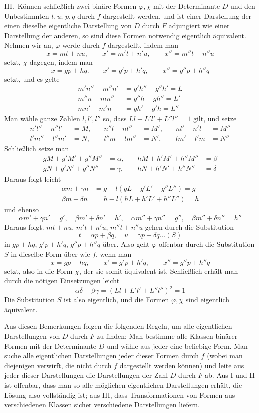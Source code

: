 III.\ Können schließlich zwei binäre Formen $\varphi,\chi$ mit der Determinante
$D$ und den Unbestimmten $t,u$; $p,q$ durch $f$ dargestellt
werden, und ist einer Darstellung der einen dieselbe eigentliche Darstellung
von $D$ durch $F$ adjungiert wie einer Darstellung der anderen,
so sind diese Formen notwendig eigentlich äquivalent. Nehmen wir an,
$\varphi$ werde durch $f$ dargestellt, indem man
\[
x=mt+nu,\qquad x'=m't+n'u,\qquad x''=m''t+n''u
\]
setzt, $\chi$ dagegen, indem man
\[
x=gp+hq.\qquad x'=g'p+h'q,\qquad x''=g''p+h''q
\]
setzt, und es gelte
\[
\begin{aligned}
m'n''-m''n'&=g'h''-g''h'=L\\
m''n-mn''&=g''h-gh''=L'\\
mn'-m'n&=gh'-g'h=L''
\end{aligned}
\]
Man wähle ganze Zahlen $l,l',l''$ so, dass $Ll+L'l'+L''l''=1$ gilt, und setze
\[
\begin{aligned}
n'l''-n''l'&=M,&\quad n''l-nl''&=M',&\quad nl'-n'l&=M''\\
l'm''-l''m'&=N,&\quad l''m-lm''&=N',&\quad lm'-l'm&=N''
\end{aligned}
\]
Schließlich setze man
\[
\begin{aligned}
gM+g'M'+g''M''&=\alpha,&\quad hM+h'M'+h''M''&=\beta\\
gN+g'N'+g''N''&=\gamma,&\quad hN+h'N'+h''N''&=\delta
\end{aligned}
\]
Daraus folgt leicht
\[
\begin{aligned}
\alpha m+\gamma n&=g-l(gL+g'L'+g''L'')=g\\
\beta m+\delta n&=h-l(hL+h'L'+h''L'')=h
\end{aligned}
\]
und ebenso
\[
\alpha m'+\gamma n'=g',\quad \beta m'+\delta n'=h',\quad
\alpha m''+\gamma n''=g'',\quad \beta m''+\delta n''=h''
\]
Daraus folgt. $mt+nu$, $m't+n'u$, $m''t+n''u$ gehen durch die Substitution
\[
t=\alpha p+\beta q,\quad u=\gamma p+\delta q\ldots(S)
\]
in $gp+hq$, $g'p+h'q$, $g''p+h''q$ über. Also geht $\varphi$ offenbar durch
die Substitution $S$ in dieselbe Form über wie $f$, wenn man
\[
x=gp+hq,\qquad x'=g'p+h'q,\qquad x''=g''p+h''q
\]
setzt, also in die Form $\chi$, der sie somit äquivalent ist.
Schließlich erhält man durch die nötigen Einsetzungen leicht
\[
\alpha\delta-\beta\gamma=(Ll+L'l'+L''l'')^2=1
\]
Die Substitution $S$ ist also eigentlich, und die Formen $\varphi,\chi$
sind eigentlich äquivalent.

Aus diesen Bemerkungen folgen die folgenden Regeln, um alle eigentlichen
Darstellungen von $D$ durch $F$ zu finden: Man bestimme alle
Klassen binärer Formen mit der Determinante $D$ und wähle aus jeder
eine beliebige Form. Man suche alle eigentlichen Darstellungen jeder dieser
Formen durch $f$ (wobei man diejenigen verwirft, die nicht durch
$f$ dargestellt werden können) und leite aus jeder dieser Darstellungen
die Darstellungen der Zahl $D$ durch $F$ ab. Aus I und II ist
offenbar, dass man so alle möglichen eigentlichen Darstellungen erhält,
die Lösung also vollständig ist; aus III, dass Transformationen von Formen
aus verschiedenen Klassen sicher verschiedene Darstellungen liefern.

